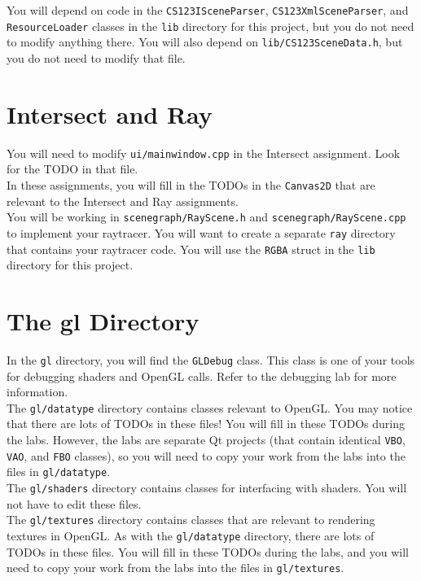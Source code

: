 \documentclass[landscape,twocolumn,letterpaper]{article}
\begin{document}
\noindent
You will depend on code in the  \texttt{CS123ISceneParser},
\texttt{CS123XmlSceneParser}, and \texttt{ResourceLoader} classes in the \texttt{lib} directory for this project, but you do not need to modify anything there. You will also depend on \texttt{lib/CS123SceneData.h}, but you do not need to modify that file.

\section{Intersect and Ray}

You will need to modify \texttt{ui/mainwindow.cpp} in the Intersect assignment. Look for the TODO in that file. \\

\noindent
In these assignments, you will fill in the TODOs in the \texttt{Canvas2D} that are relevant to the Intersect and Ray assignments.\\

\noindent
You will be working in \texttt{scenegraph/RayScene.h} and \texttt{scenegraph/RayScene.cpp} to implement your raytracer. You will want to create a separate \texttt{ray} directory that contains your raytracer code. You will use the \texttt{RGBA} struct in the \texttt{lib} directory for this project.

\section{The gl Directory}

In the \texttt{gl} directory, you will find the \texttt{GLDebug} class. This class is one of your tools for debugging shaders and OpenGL calls. Refer to the debugging lab for more information.\\

\noindent
The \texttt{gl/datatype} directory contains classes relevant to OpenGL. You may notice that there are lots of TODOs in these files! You will fill in these TODOs during the labs. However, the labs are separate Qt projects (that contain identical \texttt{VBO}, \texttt{VAO}, and \texttt{FBO} classes), so you will need to copy your work from the labs into the files in \texttt{gl/datatype}.\\

\noindent
The \texttt{gl/shaders} directory contains classes for interfacing with shaders. You will not have to edit these files. \\

\noindent
The \texttt{gl/textures} directory contains classes that are relevant to rendering textures in OpenGL. As with the \texttt{gl/datatype} directory, there are lots of TODOs in these files. You will fill in these TODOs during the labs, and you will need to copy your work from the labs into the files in \texttt{gl/textures}.\\
\end{document}
